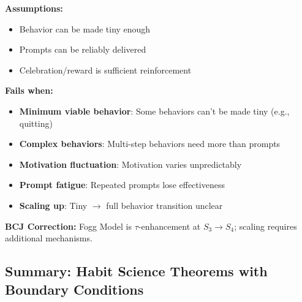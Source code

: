 \begin{tcolorbox}[colback=red!5!white, colframe=red!75!black, title=Boundary Condition: Where Fogg Model Fails]
\textbf{Assumptions:}
\begin{itemize}[nosep]
\item Behavior can be made tiny enough
\item Prompts can be reliably delivered
\item Celebration/reward is sufficient reinforcement
\end{itemize}

\textbf{Fails when:}
\begin{itemize}[nosep]
\item \textbf{Minimum viable behavior}: Some behaviors can't be made tiny (e.g., quitting)
\item \textbf{Complex behaviors}: Multi-step behaviors need more than prompts
\item \textbf{Motivation fluctuation}: Motivation varies unpredictably
\item \textbf{Prompt fatigue}: Repeated prompts lose effectiveness
\item \textbf{Scaling up}: Tiny $\to$ full behavior transition unclear
\end{itemize}

\textbf{BCJ Correction:} Fogg Model is $\tau$-enhancement at $S_3 \to S_4$; scaling requires additional mechanisms.
\end{tcolorbox}

\subsection{Summary: Habit Science Theorems with Boundary Conditions}

